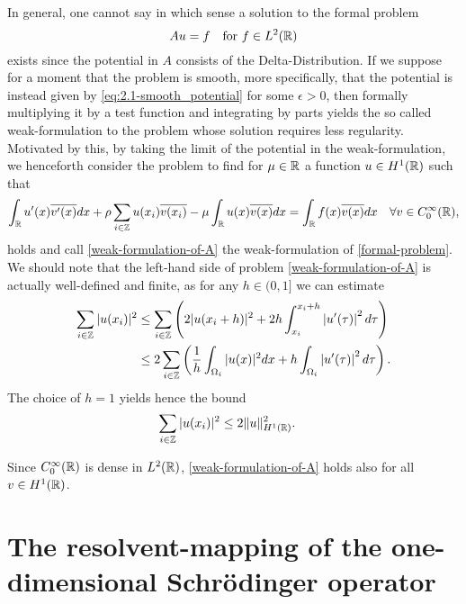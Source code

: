 In general, one cannot say in which sense a solution to the formal problem 
	\begin{equation}
		Au = f \quad \text{for } f \in L^{2}(\mathbb{R}) \label{formal-problem}
	\end{equation}
	exists since the potential in $A$ consists of the Delta-Distribution. If we suppose for a moment that the problem is smooth, more specifically, that the potential is instead given by \eqref{eq:2.1-smooth_potential} for some $\epsilon > 0$, then formally multiplying it by a test function and integrating by parts yields the so called weak-formulation to the problem whose solution requires less regularity. Motivated by this, by taking the limit of the potential in the weak-formulation, we henceforth consider the problem to find for $\mu \in \mathbb{R}$ a function $u \in H^{1}(\mathbb{R})$ such that
\begin{equation}
	\int_{\mathbb{R}} u'(x) \overline{v'(x)} dx + \rho \sum_{i \in \mathbb{Z}} u(x_{i}) \overline{v(x_{i})} - \mu \int_{\mathbb{R}} u(x) \overline{v(x)} dx = \int_{\mathbb{R}} f(x) \overline{v(x)} dx \quad \forall v \in C_{0}^{\infty}(\mathbb{R}), \label{weak-formulation-of-A}
\end{equation}	
holds and call \eqref{weak-formulation-of-A} the weak-formulation of \eqref{formal-problem}. We should note that the left-hand side of problem \eqref{weak-formulation-of-A} is actually well-defined and finite, as for any $h \in (0, 1]$ we can estimate
\begin{align}
	\sum_{i \in \mathbb{Z}} |u(x_{i})|^{2} & \leq \sum_{i \in \mathbb{Z}} \left( 2 |u( x_{i} + h )|^{2} +  2 h \int_{x_{i}}^{x_{i} + h} \left| u'(\tau) \right|^{2} d\tau \right) \notag \\
		 & \leq 2 \sum_{i \in \mathbb{Z}} \left( \frac{1}{h} \int_{\Omega_{i}} |u( x )|^{2} dx + h \int_{\Omega_{i}} \left| u'(\tau) \right|^{2} d\tau \right). \label{preestimation-for-potential}
\end{align}
The choice of $h = 1$ yields hence the bound
\begin{align} 
		\sum_{i \in \mathbb{Z}} |u(x_{i})|^{2} & \leq 2 \| u \|^{2}_{H^{1}(\mathbb{R})}. \label{estimation-for-potential}
\end{align}

\begin{remark}
	Since $C_{0}^{\infty}(\mathbb{R})$ is dense in $L^{2}(\mathbb{R})$, \eqref{weak-formulation-of-A} holds also for all $v \in H^{1}(\mathbb{R})$.
\end{remark}

\section{The resolvent-mapping of the one-dimensional Schrödinger operator} \label{sec:3.1}

